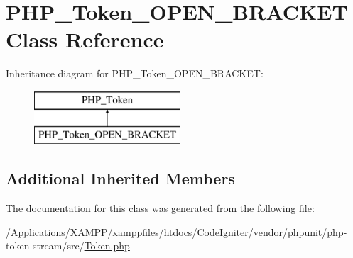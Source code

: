 \hypertarget{class_p_h_p___token___o_p_e_n___b_r_a_c_k_e_t}{}\section{P\+H\+P\+\_\+\+Token\+\_\+\+O\+P\+E\+N\+\_\+\+B\+R\+A\+C\+K\+ET Class Reference}
\label{class_p_h_p___token___o_p_e_n___b_r_a_c_k_e_t}
Inheritance diagram for P\+H\+P\+\_\+\+Token\+\_\+\+O\+P\+E\+N\+\_\+\+B\+R\+A\+C\+K\+ET\+:\begin{figure}[H]
\begin{center}
\leavevmode
\includegraphics[height=2.000000cm]{class_p_h_p___token___o_p_e_n___b_r_a_c_k_e_t}
\end{center}
\end{figure}
\subsection*{Additional Inherited Members}


The documentation for this class was generated from the following file\+:\begin{DoxyCompactItemize}
\item 
/\+Applications/\+X\+A\+M\+P\+P/xamppfiles/htdocs/\+Code\+Igniter/vendor/phpunit/php-\/token-\/stream/src/\mbox{\hyperlink{_token_8php}{Token.\+php}}\end{DoxyCompactItemize}
